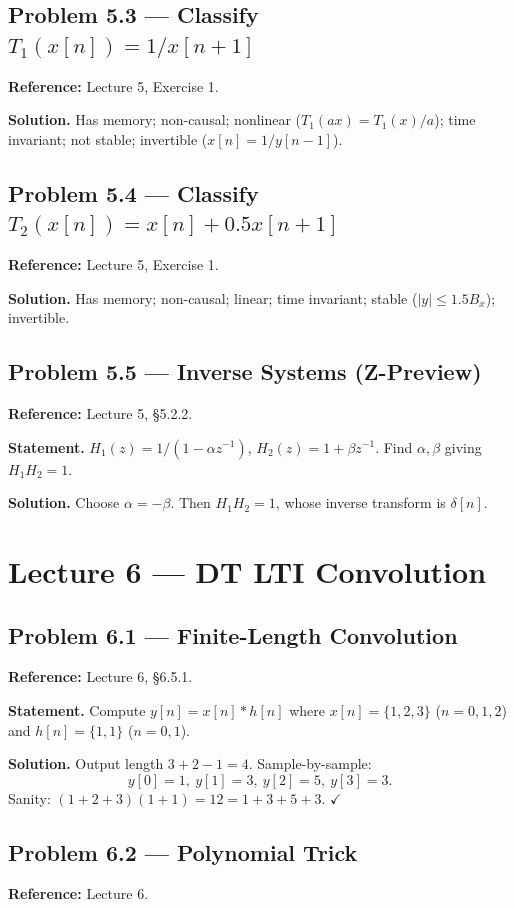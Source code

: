 \documentclass[11pt]{article}
\newcommand{\Conv}{\ast}
\begin{document}
\subsection{Problem 5.3 --- Classify $T_1(x[n])=1/x[n+1]$}
\textbf{Reference:} Lecture 5, Exercise 1.

\textbf{Solution.} Has memory; non-causal; nonlinear ($T_1(ax)=T_1(x)/a$); time invariant; not stable; invertible ($x[n]=1/y[n-1]$).

\subsection{Problem 5.4 --- Classify $T_2(x[n])=x[n]+0.5 x[n+1]$}
\textbf{Reference:} Lecture 5, Exercise 1.

\textbf{Solution.} Has memory; non-causal; linear; time invariant; stable ($|y|\le 1.5 B_x$); invertible.

\subsection{Problem 5.5 --- Inverse Systems (Z-Preview)}
\textbf{Reference:} Lecture 5, \S 5.2.2.

\textbf{Statement.} $H_1(z)=1/(1-\alpha z^{-1})$, $H_2(z)=1+\beta z^{-1}$. Find $\alpha,\beta$ giving $H_1 H_2 = 1$.

\textbf{Solution.} Choose $\alpha=-\beta$. Then $H_1H_2=1$, whose inverse transform is $\delta[n]$.

\section{Lecture 6 --- DT LTI Convolution}

\subsection{Problem 6.1 --- Finite-Length Convolution}
\textbf{Reference:} Lecture 6, \S 6.5.1.

\textbf{Statement.} Compute $y[n]=x[n]\Conv h[n]$ where $x[n]=\{1,2,3\}$ ($n=0,1,2$) and $h[n]=\{1,1\}$ ($n=0,1$).

\textbf{Solution.} Output length $3+2-1=4$. Sample-by-sample:
\[
y[0]=1,\ y[1]=3,\ y[2]=5,\ y[3]=3.
\]
Sanity: $(1+2+3)(1+1)=12=1+3+5+3$. $\checkmark$

\subsection{Problem 6.2 --- Polynomial Trick}
\textbf{Reference:} Lecture 6.
\end{document}
